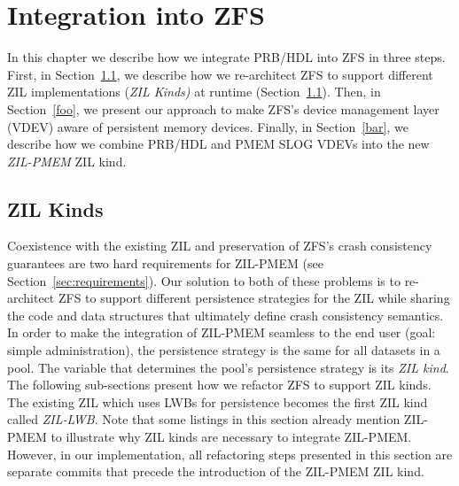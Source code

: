 \documentclass[12pt,a4paper,twoside]{book}
\begin{document}


\chapter{Integration into ZFS}\label{ch:zilpmem}
In this chapter we describe how we integrate PRB/HDL into ZFS in three steps.
First, in Section~\ref{ch:zilkinds}, we describe how we re-architect ZFS to support different ZIL implementations (\textit{ZIL Kinds)} at runtime (Section~\ref{ch:zilkinds}).
Then, in Section~\ref{foo}, we present our approach to make ZFS's device management layer (VDEV) aware of persistent memory devices.
Finally, in Section~\ref{bar}, we describe how we combine PRB/HDL and PMEM SLOG VDEVs into the new \textit{ZIL-PMEM} ZIL kind.


\section{ZIL Kinds}\label{ch:zilkinds}
Coexistence with the existing ZIL and preservation of ZFS's crash consistency guarantees are two hard requirements for ZIL-PMEM (see Section~\ref{sec:requirements}).
Our solution to both of these problems is to re-architect ZFS to support different persistence strategies for the ZIL while sharing the code and data structures that ultimately define crash consistency semantics.
In order to make the integration of ZIL-PMEM seamless to the end user (goal: simple administration), the persistence strategy is the same for all datasets in a pool.
The variable that determines the pool's persistence strategy is its \textit{ZIL kind}.
The following sub-sections present how we refactor ZFS to support ZIL kinds.
The existing ZIL which uses LWBs for persistence becomes the first ZIL kind called \textit{ZIL-LWB}.
Note that some listings in this section already mention ZIL-PMEM to illustrate why ZIL kinds are necessary to integrate ZIL-PMEM.
However, in our implementation, all refactoring steps presented in this section are separate commits that precede the introduction of the ZIL-PMEM ZIL kind.
\end{document}
